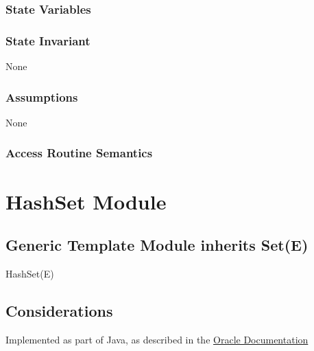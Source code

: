 \documentclass[12pt]{article}
\begin{document}
\subsubsection* {State Variables}



\subsubsection* {State Invariant}

None

\subsubsection* {Assumptions}

None

\subsubsection* {Access Routine Semantics}


\newpage

\section* {HashSet Module}

\subsection* {Generic Template Module inherits Set(E)}

HashSet(E)

\subsection* {Considerations}

Implemented as part of Java, as described in the
\href{https://docs.oracle.com/javase/8/docs/api/java/util/HashSet.html} {Oracle Documentation}
\end{document}
